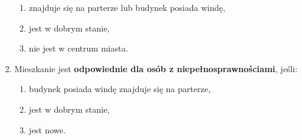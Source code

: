 \begin{enumerate}[label=N\arabic*.]
    \begin{enumerate}[label=\arabic*.]
        \item znajduje się na parterze lub budynek posiada windę,
        \item jest w dobrym stanie,
        \item nie jest w centrum miasta.
    \end{enumerate}
    \item Mieszkanie jest \textbf{odpowiednie dla osób z niepełnosprawnościami}, jeśli:
    \begin{enumerate}[label=\arabic*.]
        \item budynek posiada windę znajduje się na parterze,
        \item jest w dobrym stanie,
        \item jest nowe.
    \end{enumerate}
\end{enumerate}


